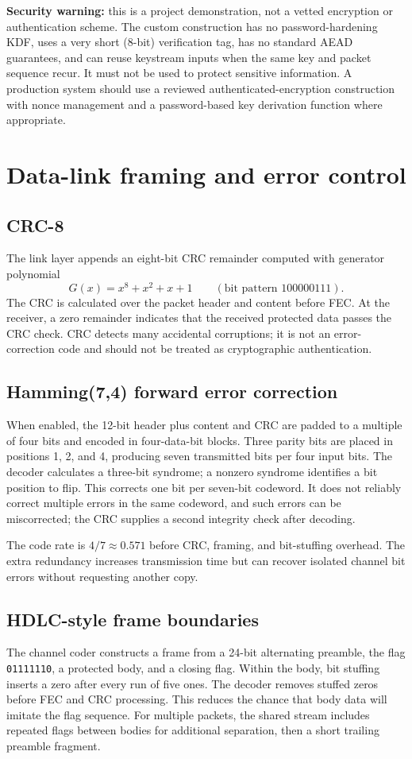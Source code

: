\documentclass[11pt,a4paper]{article}
\begin{document}
\textbf{Security warning:} this is a project demonstration, not a vetted encryption or authentication scheme. The custom construction has no password-hardening KDF, uses a very short (8-bit) verification tag, has no standard AEAD guarantees, and can reuse keystream inputs when the same key and packet sequence recur. It must not be used to protect sensitive information. A production system should use a reviewed authenticated-encryption construction with nonce management and a password-based key derivation function where appropriate.

\section{Data-link framing and error control}
\label{sec:link}

\subsection{CRC-8}
The link layer appends an eight-bit CRC remainder computed with generator polynomial
\[
    G(x)=x^8+x^2+x+1 \qquad (\text{bit pattern }100000111).
\]
The CRC is calculated over the packet header and content before FEC. At the receiver, a zero remainder indicates that the received protected data passes the CRC check. CRC detects many accidental corruptions; it is not an error-correction code and should not be treated as cryptographic authentication.

\subsection{Hamming(7,4) forward error correction}
When enabled, the 12-bit header plus content and CRC are padded to a multiple of four bits and encoded in four-data-bit blocks. Three parity bits are placed in positions 1, 2, and 4, producing seven transmitted bits per four input bits. The decoder calculates a three-bit syndrome; a nonzero syndrome identifies a bit position to flip. This corrects one bit per seven-bit codeword. It does not reliably correct multiple errors in the same codeword, and such errors can be miscorrected; the CRC supplies a second integrity check after decoding.

The code rate is $4/7\approx0.571$ before CRC, framing, and bit-stuffing overhead. The extra redundancy increases transmission time but can recover isolated channel bit errors without requesting another copy.

\subsection{HDLC-style frame boundaries}
The channel coder constructs a frame from a 24-bit alternating preamble, the flag \texttt{01111110}, a protected body, and a closing flag. Within the body, bit stuffing inserts a zero after every run of five ones. The decoder removes stuffed zeros before FEC and CRC processing. This reduces the chance that body data will imitate the flag sequence. For multiple packets, the shared stream includes repeated flags between bodies for additional separation, then a short trailing preamble fragment.
\end{document}
